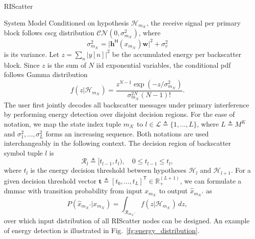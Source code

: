 \documentclass[journal]{IEEEtran}
\begin{document}
\begin{section}{RIScatter}
\begin{subsection}{System Model}
		Conditioned on hypothesis $\mathcal{H}_{m_{\mathcal{K}}}$, the receive signal per primary block follows \gls{cscg} distribution $\mathcal{CN}(0,\sigma_{m_{\mathcal{K}}}^2)$, where
		\begin{equation}
			\sigma_{m_{\mathcal{K}}}^2 = \lvert \boldsymbol{h}^\mathsf{H}(x_{m_{\mathcal{K}}}) \boldsymbol{w} \rvert^2 + \sigma_v^2
			\label{eq:receive_variance}
		\end{equation}
		is its variance.
		Let $z=\sum_{n} \bigl\lvert y[n] \bigr\rvert^2$ be the accumulated energy per backscatter block.
		Since $z$ is the sum of $N$ \gls{iid} exponential variables, the conditional \gls{pdf} follows Gamma distribution
		\begin{equation}
			f(z|\mathcal{H}_{m_{\mathcal{K}}}) = \frac{z^{N-1} \exp(-z/\sigma_{m_{\mathcal{K}}}^2)}{\sigma_{m_{\mathcal{K}}}^{2N} (N-1)!}.
			\label{eq:energy_distribution}
		\end{equation}
		The user first jointly decodes all backscatter messages under primary interference by performing energy detection over disjoint decision regions.
		For the ease of notation, we map the state index tuple $m_{\mathcal{K}}$ to $l \in \mathcal{L} \triangleq \{1,\ldots,L\}$, where $L \triangleq M^K$ and $\sigma_1^2,\ldots,\sigma_L^2$ forms an increasing sequence.
		Both notations are used interchangeably in the following context.
		The decision region of backscatter symbol tuple $l$ is
		\begin{equation}
			\mathcal{R}_{l} \triangleq [t_{l-1},t_l), \quad 0 \le t_{l-1} \le t_l,
		\end{equation}
		where $t_l$ is the energy decision threshold between hypotheses $\mathcal{H}_{l}$ and $\mathcal{H}_{l+1}$.
		For a given decision threshold vector $\boldsymbol{t} \triangleq [t_0,\ldots,t_L]^\mathsf{T} \in \mathbb{R}_+^{(L+1)}$, we can formulate a \gls{dmmac} with transition probability from input $x_{m_{\mathcal{K}}}$ to output $\hat{x}_{m_{\mathcal{K}}'}$ as
		\begin{equation}
			P(\hat{x}_{m_{\mathcal{K}}'}|x_{m_{\mathcal{K}}}) = \int_{\mathcal{R}_{m_{\mathcal{K}}'}} f(z|\mathcal{H}_{m_{\mathcal{K}}}) \, d z,
			\label{eq:dmmac}
		\end{equation}
		over which input distribution of all RIScatter nodes can be designed.
		An example of energy detection is illustrated in Fig.~\ref{fg:energy_distribution}.

\end{subsection}
\end{section}
\end{document}
